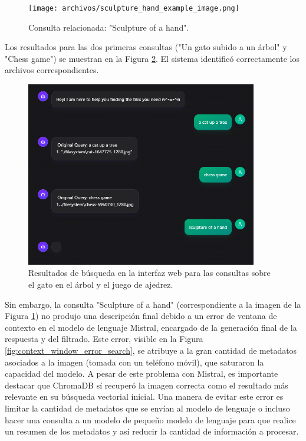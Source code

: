 \begin{figure}[H]
\centering
\texttt{[image: archivos/sculpture\_hand\_example\_image.png]}
\caption[Imagen de una escultura de una mano]{Consulta relacionada: "Sculpture of a hand".}
\label{fig:search_hand_sculpture}
\end{figure}

Los resultados para las dos primeras consultas ("Un gato subido a un árbol" y "Chess game") se muestran en la Figura \ref{fig:web_search_results_cat_chess}. El sistema identificó correctamente los archivos correspondientes.

\begin{figure}[H]
\centering
\includegraphics[width=0.9\textwidth]{archivos/web_multiple_results.png}
\caption[Resultados de búsqueda para gato y ajedrez]{Resultados de búsqueda en la interfaz web para las consultas sobre el gato en el árbol y el juego de ajedrez.}
\label{fig:web_search_results_cat_chess}
\end{figure}

Sin embargo, la consulta "Sculpture of a hand" (correspondiente a la imagen de la Figura \ref{fig:search_hand_sculpture}) no produjo una descripción final debido a un error de ventana de contexto en el modelo de lenguaje Mistral, encargado de la generación final de la respuesta y del filtrado. Este error, visible en la Figura \ref{fig:context_window_error_search}, se atribuye a la gran cantidad de metadatos asociados a la imagen (tomada con un teléfono móvil), que saturaron la capacidad del modelo. A pesar de este problema con Mistral, es importante destacar que ChromaDB sí recuperó la imagen correcta como el resultado más relevante en su búsqueda vectorial inicial.
Una manera de evitar este error es limitar la cantidad de metadatos que se envían al modelo de lenguaje o incluso hacer una consulta a un modelo de pequeño modelo de lenguaje para que realice un resumen de los metadatos y así reducir la cantidad de información a procesar.

